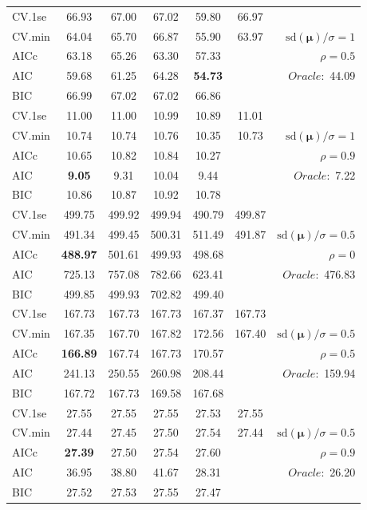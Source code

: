 \begin{table}
\begin{center}
\begin{tabular}{l*{5}{c}|r}
 \hline 
CV.1se & 66.93 & 67.00 & 67.02 & 59.80 & 66.97 & \\
CV.min & 64.04 & 65.70 & 66.87 & 55.90 & 63.97 &  $\mathrm{sd}(\mathbf{\mu})/\sigma=1$ \\
AICc & 63.18 & 65.26 & 63.30 & 57.33 & & $\rho=0.5$ \\
AIC & 59.68 & 61.25 & 64.28 & {\bf 54.73} & &  \multirow{2}{*}{$Oracle: $ 44.09} \\
BIC & 66.99 & 67.02 & 67.02 & 66.86 & &  \\
 \hline 
CV.1se & 11.00 & 11.00 & 10.99 & 10.89 & 11.01 & \\
CV.min & 10.74 & 10.74 & 10.76 & 10.35 & 10.73 &  $\mathrm{sd}(\mathbf{\mu})/\sigma=1$ \\
AICc & 10.65 & 10.82 & 10.84 & 10.27 & & $\rho=0.9$ \\
AIC & {\bf 9.05} & 9.31 & 10.04 & 9.44 & &  \multirow{2}{*}{$Oracle: $ 7.22} \\
BIC & 10.86 & 10.87 & 10.92 & 10.78 & &  \\
 \hline 
CV.1se & 499.75 & 499.92 & 499.94 & 490.79 & 499.87 & \\
CV.min & 491.34 & 499.45 & 500.31 & 511.49 & 491.87 &  $\mathrm{sd}(\mathbf{\mu})/\sigma=0.5$ \\
AICc & {\bf 488.97} & 501.61 & 499.93 & 498.68 & & $\rho=0$ \\
AIC & 725.13 & 757.08 & 782.66 & 623.41 & &  \multirow{2}{*}{$Oracle: $ 476.83} \\
BIC & 499.85 & 499.93 & 702.82 & 499.40 & &  \\
 \hline 
CV.1se & 167.73 & 167.73 & 167.73 & 167.37 & 167.73 & \\
CV.min & 167.35 & 167.70 & 167.82 & 172.56 & 167.40 &  $\mathrm{sd}(\mathbf{\mu})/\sigma=0.5$ \\
AICc & {\bf 166.89} & 167.74 & 167.73 & 170.57 & & $\rho=0.5$ \\
AIC & 241.13 & 250.55 & 260.98 & 208.44 & &  \multirow{2}{*}{$Oracle: $ 159.94} \\
BIC & 167.72 & 167.73 & 169.58 & 167.68 & &  \\
 \hline 
CV.1se & 27.55 & 27.55 & 27.55 & 27.53 & 27.55 & \\
CV.min & 27.44 & 27.45 & 27.50 & 27.54 & 27.44 &  $\mathrm{sd}(\mathbf{\mu})/\sigma=0.5$ \\
AICc & {\bf 27.39} & 27.50 & 27.54 & 27.60 & & $\rho=0.9$ \\
AIC & 36.95 & 38.80 & 41.67 & 28.31 & &  \multirow{2}{*}{$Oracle: $ 26.20} \\
BIC & 27.52 & 27.53 & 27.55 & 27.47 & &  \\
 \hline 
\end{tabular}
\end{center}
\vspace{-1cm}
\end{table}





